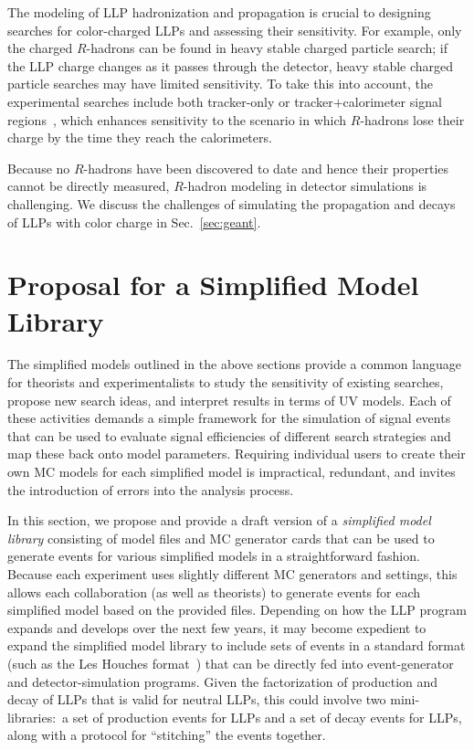 The modeling of LLP hadronization and propagation is crucial to designing searches for color-charged LLPs and assessing their sensitivity. For example,  only the charged $R$-hadrons can be found in heavy stable charged particle search; if the LLP charge changes as it passes through the detector, heavy stable charged particle searches may have limited sensitivity. To take this into account, the experimental searches  include both tracker-only or tracker$+$calorimeter signal regions~\cite{Aaboud:2016uth,CMS-PAS-EXO-16-036}, which enhances sensitivity to the scenario in which $R$-hadrons lose their charge by the time they reach the calorimeters. 

Because no $R$-hadrons have been discovered to date and hence their properties cannot be directly measured, $R$-hadron modeling in detector simulations is challenging. We discuss  the challenges of simulating the propagation and decays of  LLPs with color charge in Sec.~\ref{sec:geant}.








\section{Proposal for a Simplified Model Library}\label{sec:library}

The simplified models outlined in the above sections provide a common language for theorists and experimentalists to study the sensitivity of existing searches, propose new search ideas, and interpret results in terms of UV models.
Each of these activities demands a simple framework for the simulation of signal events that can be used to evaluate signal efficiencies of different search strategies and map these back onto model parameters.
Requiring individual users to create their own MC models for each simplified model is impractical, redundant, and invites the introduction of errors into the analysis process.

In this section, we propose and provide a draft version of a \emph{simplified model library} consisting of model files and MC generator cards that can be used to generate events for various simplified models in a straightforward fashion.
Because each experiment uses slightly different MC generators and settings, this allows each collaboration (as well as theorists) to generate events for each simplified model based on the provided files.
Depending on how the LLP program expands and develops over the next few years, it may become expedient to expand the simplified model library to include sets of events in a standard format (such as the Les Houches format~\cite{Alwall:2006yp}) that can be directly fed into event-generator and detector-simulation programs.
Given the factorization of production and decay of LLPs that is valid for neutral LLPs, this could involve two mini-libraries:~a set of production events for LLPs and a set of decay events for LLPs, along with a protocol for ``stitching'' the events together.

